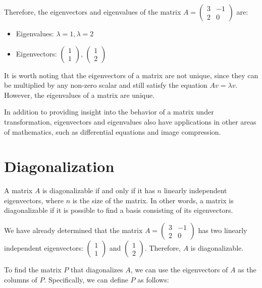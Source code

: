 \documentclass{article}
\begin{document}
Therefore, the eigenvectors and eigenvalues of the matrix $A = \begin{pmatrix} 3 & -1 \\ 2 & 0 \end{pmatrix}$ are:

\begin{itemize}
    \item Eigenvalues: $\lambda = 1, \lambda = 2$
    \item Eigenvectors: $\begin{pmatrix} 1 \\ 1 \end{pmatrix}$, $\begin{pmatrix} 1 \\ 2 \end{pmatrix}$
\end{itemize}

It is worth noting that the eigenvectors of a matrix are not unique, since they can be multiplied by any non-zero scalar and still satisfy the equation $Av = \lambda v$. However, the eigenvalues of a matrix are unique.

In addition to providing insight into the behavior of a matrix under transformation, eigenvectors and eigenvalues also have applications in other areas of mathematics, such as differential equations and image compression.

\section{Diagonalization}

A matrix $A$ is diagonalizable if and only if it has $n$ linearly independent eigenvectors, where $n$ is the size of the matrix. In other words, a matrix is diagonalizable if it is possible to find a basis consisting of its eigenvectors.

We have already determined that the matrix $A = \begin{pmatrix} 3 & -1 \\ 2 & 0 \end{pmatrix}$ has two linearly independent eigenvectors: $\begin{pmatrix} 1 \\ 1 \end{pmatrix}$ and $\begin{pmatrix} 1 \\ 2 \end{pmatrix}$. Therefore, $A$ is diagonalizable.

To find the matrix $P$ that diagonalizes $A$, we can use the eigenvectors of $A$ as the columns of $P$. Specifically, we can define $P$ as follows:
\end{document}
